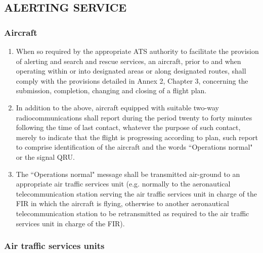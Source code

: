 \subsection[Alerting service]{ALERTING SERVICE}

\subsubsection{Aircraft}


\begin{enumerate}
    \item When so required by the appropriate ATS authority to facilitate the provision of alerting and search and rescue services, an aircraft, prior to and when operating within or into designated areas or along designated routes, shall comply with the provisions detailed in Annex 2, Chapter 3, concerning the submission, completion, changing and closing of a flight plan.
    \item In addition to the above, aircraft equipped with suitable two-way radiocommunications shall report during the period twenty to forty minutes following the time of last contact, whatever the purpose of such contact, merely to indicate that the flight is progressing according to plan, such report to comprise identification of the aircraft and the words ``Operations normal" or the signal QRU.
    \item The ``Operations normal" message shall be transmitted air-ground to an appropriate air traffic services unit (e.g. normally to the aeronautical telecommunication station serving the air traffic services unit in charge of the FIR in which the aircraft is flying, otherwise to another aeronautical telecommunication station to be retransmitted as required to the air traffic services unit in charge of the FIR).

\end{enumerate}

\subsubsection{Air traffic services units}


